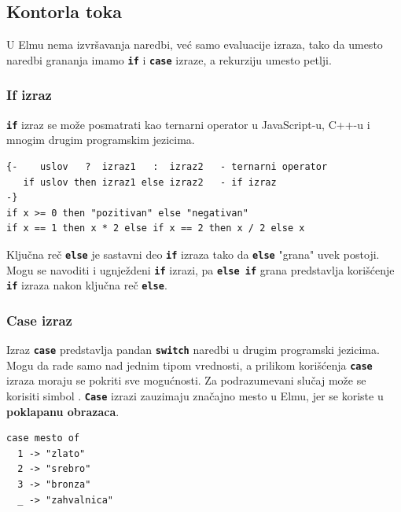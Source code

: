 \documentclass[12pt,oneside]{memoir}
\begin{document}
\subsection{Kontorla toka}
U Elmu nema izvršavanja naredbi, već samo evaluacije izraza, tako da umesto naredbi grananja
imamo \texttt{\textbf{if}} i \texttt{\textbf{case}} izraze, a rekurziju umesto petlji.  
\subsubsection{If izraz}
\texttt{\textbf{if}} izraz se može posmatrati kao ternarni operator u JavaScript-u, C++-u i 
mnogim drugim programskim jezicima.
\begin{listing}[h]
\begin{verbatim}
{-    uslov   ?  izraz1   :  izraz2   - ternarni operator
   if uslov then izraz1 else izraz2   - if izraz
-}
if x >= 0 then "pozitivan" else "negativan"
if x == 1 then x * 2 else if x == 2 then x / 2 else x
\end{verbatim}
\caption{If izraz}
\label{listing:if}
\end{listing}

Ključna reč \texttt{\textbf{else}} je sastavni deo \texttt{\textbf{if}} izraza tako
da \texttt{\textbf{else}} "grana" uvek postoji. Mogu se navoditi i ugnježdeni
\texttt{\textbf{if}} izrazi, pa \texttt{\textbf{else if}} grana predstavlja korišćenje
\texttt{\textbf{if}} izraza nakon ključna reč \texttt{\textbf{else}}.

\subsubsection{Case izraz}
Izraz \texttt{\textbf{case}} predstavlja pandan \texttt{\textbf{switch}} naredbi u drugim
programski jezicima. Mogu da rade samo nad jednim tipom vrednosti, a prilikom korišćenja 
\texttt{\textbf{case}} izraza moraju se pokriti sve mogućnosti. Za podrazumevani slučaj 
može se korisiti simbol \texttt{\textbf{\textunderscore}}. \texttt{\textbf{Case}} izrazi 
zauzimaju značajno mesto u Elmu, jer se koriste u \textbf{poklapanu obrazaca}.
\begin{listing}[h]
\begin{verbatim}
case mesto of
  1 -> "zlato"
  2 -> "srebro"
  3 -> "bronza"
  _ -> "zahvalnica"
\end{verbatim}
\caption{If izraz}
\label{listing:case}
\end{listing}
\end{document}
